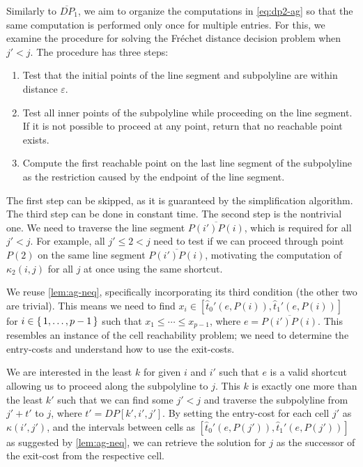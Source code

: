 Similarly to \(\overline{DP}_1\), we aim to organize the computations in \cref{eq:dp2-ag} so that the same computation is performed only once for multiple entries. For this, we examine the procedure for solving the Fréchet distance decision problem when \(j' < j\). The procedure has three steps:
\begin{enumerate}
	\item Test that the initial points of the line segment and subpolyline are within distance \(\varepsilon\).
	\item Test all inner points of the subpolyline while proceeding on the line segment. If it is not possible to proceed at any point, return that no reachable point exists.
	\item Compute the first reachable point on the last line segment of the subpolyline as the restriction caused by the endpoint of the line segment.
\end{enumerate}

The first step can be skipped, as it is guaranteed by the simplification algorithm. The third step can be done in constant time. The second step is the nontrivial one. We need to traverse the line segment \(\overline{P(i')P(i)}\), which is required for all \(j' < j\). For example, all \(j' \leq 2 < j\) need to test if we can proceed through point \(P(2)\) on the same line segment \(\overline{P(i')P(i)}\), motivating the computation of \(\kappa_2(i, j)\) for all \(j\) at once using the same shortcut. 

We reuse \cref{lem:ag-neq}, specifically incorporating its third condition (the other two are trivial). This means we need to find \(x_i \in [\hat t_0'(e, P(i)), \hat t_1'(e, P(i))]\) for \(i \in \set{1, \dots, p - 1}\) such that \(x_1 \leq \cdots \leq x_{p-1}\), where \(e = \overline{P(i')P(i)}\). This resembles an instance of the cell reachability problem; we need to determine the entry-costs and understand how to use the exit-costs.

We are interested in the least \(k\) for given \(i\) and \(i'\) such that \(e\) is a valid shortcut allowing us to proceed along the subpolyline to \(j\). This \(k\) is exactly one more than the least \(k'\) such that we can find some \(j' < j\) and traverse the subpolyline from \(j' + t'\) to \(j\), where \(t' = DP[k', i', j']\). By setting the entry-cost for each cell \(j'\) as \(\kappa(i',j')\), and the intervals between cells as \([\hat t_0'(e, P(j')), \hat t_1'(e, P(j'))]\) as suggested by \cref{lem:ag-neq}, we can retrieve the solution for \(j\) as the successor of the exit-cost from the respective cell.

